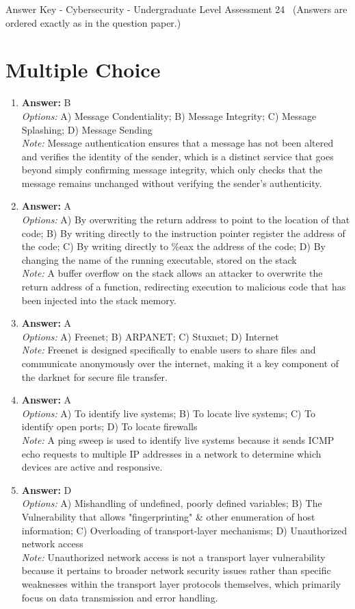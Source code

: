 \documentclass[12pt]{article}
\begin{document}
\begin{center}
Answer Key - Cybersecurity - Undergraduate Level Assessment 24 \
\small (Answers are ordered exactly as in the question paper.)
\end{center}

\section*{Multiple Choice}
\begin{enumerate}[label=\arabic*.]
\item \textbf{Answer:} B
\\ \textit{Options:} A) Message Condentiality; B) Message Integrity; C) Message Splashing; D) Message Sending
\\ \textit{Note:} Message authentication ensures that a message has not been altered and verifies the identity of the sender, which is a distinct service that goes beyond simply confirming message integrity, which only checks that the message remains unchanged without verifying the sender's authenticity.
\item \textbf{Answer:} A
\\ \textit{Options:} A) By overwriting the return address to point to the location of that code; B) By writing directly to the instruction pointer register the address of the code; C) By writing directly to \%eax the address of the code; D) By changing the name of the running executable, stored on the stack
\\ \textit{Note:} A buffer overflow on the stack allows an attacker to overwrite the return address of a function, redirecting execution to malicious code that has been injected into the stack memory.
\item \textbf{Answer:} A
\\ \textit{Options:} A) Freenet; B) ARPANET; C) Stuxnet; D) Internet
\\ \textit{Note:} Freenet is designed specifically to enable users to share files and communicate anonymously over the internet, making it a key component of the darknet for secure file transfer.
\item \textbf{Answer:} A
\\ \textit{Options:} A) To identify live systems; B) To locate live systems; C) To identify open ports; D) To locate firewalls
\\ \textit{Note:} A ping sweep is used to identify live systems because it sends ICMP echo requests to multiple IP addresses in a network to determine which devices are active and responsive.
\item \textbf{Answer:} D
\\ \textit{Options:} A) Mishandling of undefined, poorly defined variables; B) The Vulnerability that allows "fingerprinting" \& other enumeration of host information; C) Overloading of transport-layer mechanisms; D) Unauthorized network access
\\ \textit{Note:} Unauthorized network access is not a transport layer vulnerability because it pertains to broader network security issues rather than specific weaknesses within the transport layer protocols themselves, which primarily focus on data transmission and error handling.
\end{enumerate}
\end{document}
